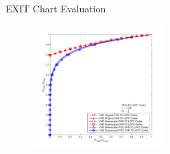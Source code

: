 \documentclass[11pt, aspectratio=169]{beamer}
\begin{document}
\begin{frame}{EXIT Chart Evaluation}
\begin{figure}
\begin{minipage}{.5\linewidth}
			\vspace{-0.5cm}
		\end{minipage}
		\hfill
				\hspace{ -2in}
			\begin{minipage}{.5\linewidth}
			\hspace{3 cm}
			\includegraphics[width=2in]{gambarafa/exit/23/23semua=snr4Ich=0,795.pdf}
			\vspace{-0.9cm}
		\end{minipage}
		\label{gambar: awgnhasil}
	\end{figure}
	


\end{frame}
\end{document}
